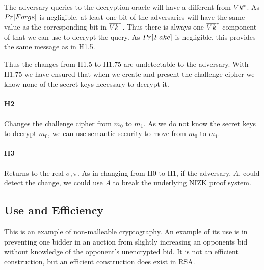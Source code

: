 The adversary queries to the decryption oracle will have a \Vk different from $Vk^*$.
As $Pr[Forge]$ is negligible,
at least one bit of the adversaries \Vk will have the same value as the corresponding bit in $\overline{Vk}^*$.
Thus there is always one $\overline{Vk}^*$ component of \Sk that we can use to decrypt the query.
As $Pr[Fake]$ is negligible, this provides the same message as in H1.5.


Thus the changes from H1.5 to H1.75 are undetectable to the adversary.
With H1.75 we have ensured that when we create and present the challenge cipher we know none of the secret keys necessary to decrypt it.

\paragraph{H2}
Changes the challenge cipher from $m_0$ to $m_1$.
As we do not know the secret keys to decrypt $m_0$, we can use semantic security to move from $m_0$ to $m_1$.

\paragraph{H3}
Returns to the real $\sigma, \pi$.
As in changing from H0 to H1, if the adversary, $A$, could detect the change,
we could use $A$ to break the underlying NIZK proof system.

\subsection{Use and Efficiency}
This is an example of non-malleable cryptography.
An example of its use is in preventing one bidder in an auction from
slightly increasing an opponents bid without knowledge of the opponent's unencrypted bid.
It is not an efficient construction, but an efficient construction does exist in RSA.




